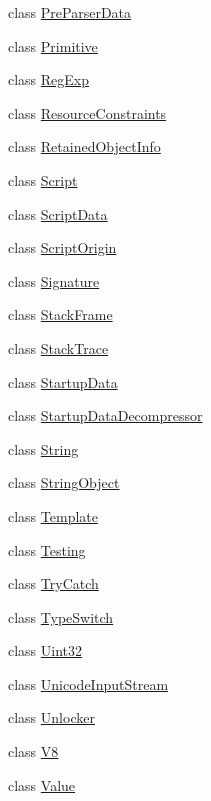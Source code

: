 \begin{DoxyCompactItemize}
\item 
class \hyperlink{classv8_1_1_pre_parser_data}{Pre\+Parser\+Data}
\item 
class \hyperlink{classv8_1_1_primitive}{Primitive}
\item 
class \hyperlink{classv8_1_1_reg_exp}{Reg\+Exp}
\item 
class \hyperlink{classv8_1_1_resource_constraints}{Resource\+Constraints}
\item 
class \hyperlink{classv8_1_1_retained_object_info}{Retained\+Object\+Info}
\item 
class \hyperlink{classv8_1_1_script}{Script}
\item 
class \hyperlink{classv8_1_1_script_data}{Script\+Data}
\item 
class \hyperlink{classv8_1_1_script_origin}{Script\+Origin}
\item 
class \hyperlink{classv8_1_1_signature}{Signature}
\item 
class \hyperlink{classv8_1_1_stack_frame}{Stack\+Frame}
\item 
class \hyperlink{classv8_1_1_stack_trace}{Stack\+Trace}
\item 
class \hyperlink{classv8_1_1_startup_data}{Startup\+Data}
\item 
class \hyperlink{classv8_1_1_startup_data_decompressor}{Startup\+Data\+Decompressor}
\item 
class \hyperlink{classv8_1_1_string}{String}
\item 
class \hyperlink{classv8_1_1_string_object}{String\+Object}
\item 
class \hyperlink{classv8_1_1_template}{Template}
\item 
class \hyperlink{classv8_1_1_testing}{Testing}
\item 
class \hyperlink{classv8_1_1_try_catch}{Try\+Catch}
\item 
class \hyperlink{classv8_1_1_type_switch}{Type\+Switch}
\item 
class \hyperlink{classv8_1_1_uint32}{Uint32}
\item 
class \hyperlink{classv8_1_1_unicode_input_stream}{Unicode\+Input\+Stream}
\item 
class \hyperlink{classv8_1_1_unlocker}{Unlocker}
\item 
class \hyperlink{classv8_1_1_v8}{V8}
\item 
class \hyperlink{classv8_1_1_value}{Value}
\end{DoxyCompactItemize}
